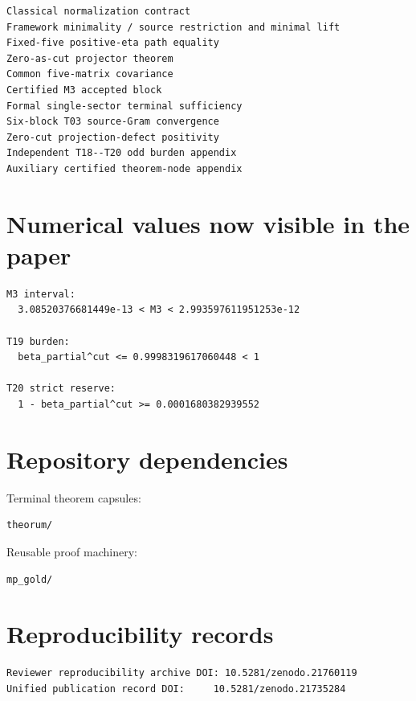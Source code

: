\begin{verbatim}
Classical normalization contract
Framework minimality / source restriction and minimal lift
Fixed-five positive-eta path equality
Zero-as-cut projector theorem
Common five-matrix covariance
Certified M3 accepted block
Formal single-sector terminal sufficiency
Six-block T03 source-Gram convergence
Zero-cut projection-defect positivity
Independent T18--T20 odd burden appendix
Auxiliary certified theorem-node appendix
\end{verbatim}

\hypertarget{numerical-values-now-visible-in-the-paper}{%
\section{Numerical values now visible in the paper}\label{numerical-values-now-visible-in-the-paper}}

\begin{verbatim}
M3 interval:
  3.08520376681449e-13 < M3 < 2.993597611951253e-12

T19 burden:
  beta_partial^cut <= 0.9998319617060448 < 1

T20 strict reserve:
  1 - beta_partial^cut >= 0.0001680382939552
\end{verbatim}

\hypertarget{repository-dependencies}{%
\section{Repository dependencies}\label{repository-dependencies}}

Terminal theorem capsules:

\begin{verbatim}
theorum/
\end{verbatim}

Reusable proof machinery:

\begin{verbatim}
mp_gold/
\end{verbatim}

\hypertarget{reproducibility-records}{%
\section{Reproducibility records}\label{reproducibility-records}}

\begin{verbatim}
Reviewer reproducibility archive DOI: 10.5281/zenodo.21760119
Unified publication record DOI:     10.5281/zenodo.21735284
\end{verbatim}

